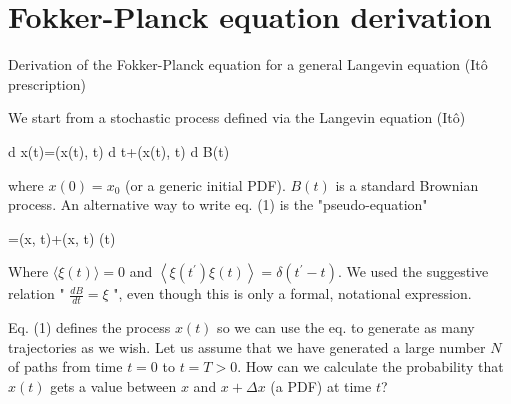 
\section{Fokker-Planck equation derivation}
Derivation of the Fokker-Planck equation for a general Langevin equation (Itô
prescription)

We start from a stochastic process defined via the Langevin equation (Itô)
\begin{DispWithArrows}[displaystyle, format=c]
  d x(t)=\mu(x(t), t) d t+\sigma(x(t), t) d B(t)
\end{DispWithArrows}
where $x(0)=x_{0}$ (or a generic initial PDF). $B(t)$ is a standard Brownian
process.
An alternative way to write eq. (1) is the "pseudo-equation"
\begin{DispWithArrows}[displaystyle, format=c]
  =\mu(x, t)+\sigma(x, t) \xi(t)
\end{DispWithArrows}
Where $\langle\xi(t)\rangle=0$ and
$\left\langle\xi\left(t^{\prime}\right) \xi(t)\right\rangle=\delta\left(t^{\prime}-t\right)$.
We used the suggestive relation " $\frac{d B}{d t}=\xi$ ", even though this is
only a formal, notational expression.

Eq. (1) defines the process $x(t)$ so we can use the eq. to generate as many
trajectories as we wish. Let us assume that we have generated a large number $N$
of paths from time $t=0$ to $t=T>0$. How can we calculate the probability that
$x(t)$ gets a value between $x$ and $x+\Delta x$ (a PDF) at time $t$?

